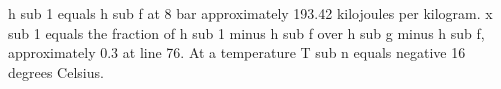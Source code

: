 h sub 1 equals h sub f at 8 bar approximately 193.42 kilojoules per kilogram. x sub 1 equals the fraction of h sub 1 minus h sub f over h sub g minus h sub f, approximately 0.3 at line 76. At a temperature T sub n equals negative 16 degrees Celsius.